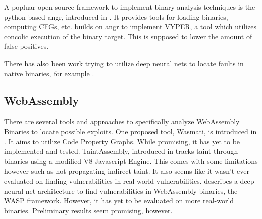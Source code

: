 \documentclass[sigconf]{acmart}
\begin{document}
A popluar open-source framework to implement binary analysis techniques is the python-based angr, introduced in \cite{shoshitaishvili_sok_2016}. It provides tools for loading binaries, computing CFGs, etc. \cite{boudjema_vyper_2020} builds on angr to implement VYPER, a tool which utilizes concolic execution of the binary target. This is supposed to lower the amount of false positives. 

There has also been work trying to utilize deep neural nets to locate faults in native binaries, for example \cite{li_locating_2019}.

\subsection{WebAssembly}
\label{sec:wasm_analysis}
There are several tools and approaches to specifically analyze WebAssembly Binaries to locate possible exploits. One proposed tool, Wasmati, is introduced in \cite{lopes_discovering_2021}. It aims to utilize Code Property Graphs. While promising, it has yet to be implemented and tested. TaintAssembly, introduced in \cite{fu_taintassembly_2018} tracks taint through binaries using a modified V8 Javascript Engine. This comes with some limitations however such as not propagating indirect taint. It also seems like it wasn't ever evaluated on finding vulnerabilities in real-world vulnerabilities. \cite{sun_poster_2021} describes a deep neural net architecture to find vulnerabilities in WebAssembly binaries, the WASP framework. However, it has yet to be evaluated on more real-world binaries. Preliminary results seem promising, however. 
\end{document}
